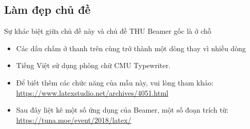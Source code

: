 \documentclass{beamer}
\begin{document}
\subsection{Làm đẹp chủ đề}
\begin{frame}{Sự khác biệt giữa chủ đề này và chủ đề THU Beamer gốc là ở chỗ}
    \begin{itemize}
        \item Các dấu chấm ở thanh trên cùng trở thành một dòng thay vì nhiều dòng
        \item Tiếng Việt sử dụng phông chữ CMU Typewriter.
        \item Để biết thêm các chức năng của mẫu này, vui lòng tham khảo: \url{https://www.latexstudio.net/archives/4051.html}
        \item Sau đây liệt kê một số ứng dụng của Beamer, một số đoạn trích từ: \url{https://tuna.moe/event/2018/latex/}
    \end{itemize}
\end{frame}

\end{document}
